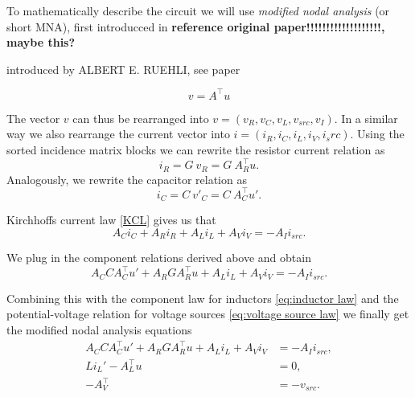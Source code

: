 To mathematically describe the circuit we will use \emph{modified nodal analysis} (or short MNA), first introducced in \textbf{reference original paper!!!!!!!!!!!!!!!!!!!, maybe this?}
	
	introduced by ALBERT E. RUEHLI, see paper	
	
	
\begin{displaymath}
	v = A^\top u
\end{displaymath}

The vector $v$ can thus be rearranged into $v = (v_R, v_C, v_L, v_{src}, v_I)$. In a similar way we also rearrange the current vector into $i = (i_R, i_C, i_L, i_V, i_src)$. Using the sorted incidence matrix blocks we can rewrite the resistor current relation as
	\begin{displaymath}
		i_R = G \ v_R = G \ A_R^\top u.
	\end{displaymath}
Analogously, we rewrite the capacitor relation as
	\begin{displaymath}
		i_C = C \ v'_C = C \ A_C^\top u'.
	\end{displaymath}

Kirchhoffs current law \eqref{KCL} gives us that
\begin{displaymath}
	A_C i_C + A_R i_R + A_L i_L + A_V i_V = -A_I i_{src}.
\end{displaymath}

We plug in the component relations derived above and obtain
\begin{displaymath}
	A_C C A_C^\top u' + A_R G A_R^\top u + A_L i_L + A_V i_V = -A_I i_{src}.
 \end{displaymath}

Combining this with the component law for inductors \eqref{eq:inductor law} and the potential-voltage relation for voltage sources \eqref{eq:voltage source law} we finally get the modified nodal analysis equations
\begin{displaymath}
	\begin{aligned}
		A_C C A_C^\top u' + A_R G A_R^\top u + A_L i_L + A_V i_V &= - A_I i_{src} , \\
		L i_L'	- A_L^\top u &= 0 , \\
		-A_V^\top &=  -v_{src}.
	\end{aligned}	
\end{displaymath}

